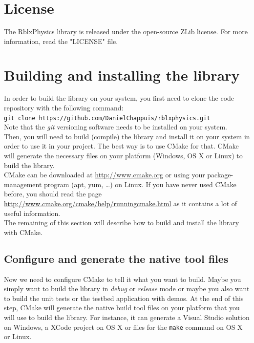 \documentclass[a4paper,12pt]{article}
\begin{document}
    \section{License}

    The RblxPhysics library is released under the open-source ZLib license. For more information, read the "LICENSE" file.

    \section{Building and installing the library}
    \label{sec:building}

    In order to build the library on your system, you first need to clone the code repository with the following command: \\

    \texttt{git clone https://github.com/DanielChappuis/rblxphysics.git} \\

    Note that the \emph{git} versioning software needs to be installed on your system. \\

    Then, you will need to build (compile) the library and install it on your system in order to use it in your project.
    The best way is to use CMake for that. CMake will generate the necessary files on your platform (Windows, OS X or Linux) to build
    the library. \\

    CMake can be downloaded at \url{http://www.cmake.org} or using your package-management program (apt, yum, \dots) on Linux.
    If you have never used CMake before, you should read the page \url{http://www.cmake.org/cmake/help/runningcmake.html} as
    it contains a lot of useful information. \\

    The remaining of this section will describe how to build and install the library with CMake. \\

    \subsection{Configure and generate the native tool files}

    Now we need to configure CMake to tell it what you want to build. Maybe you simply want to build the library in \emph{debug} or \emph{release}
    mode or maybe you also want to build the unit tests or the testbed application with demos. At the end of this step, CMake will generate the
    native build tool files on your platform that you will use to build the library. For instance, it can generate a Visual Studio solution on Windows,
    a XCode project on OS X or files for the \texttt{make} command on OS X or Linux.
\end{document}
